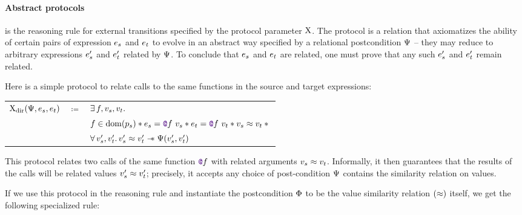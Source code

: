 \paragraph{Abstract protocols}
 is the reasoning rule for external transitions specified by the protocol parameter $\mathrm{X}$.
The protocol is a relation that axiomatizes the ability of certain pairs of expression $\datalangExpr_s$ and $\datalangExpr_t$ to evolve in an abstract way specified by a relational postcondition $\Psi$ -- they may reduce to arbitrary expressions $\datalangExpr_s'$ and $\datalangExpr_t'$ related by $\Psi$.
To conclude that $\datalangExpr_s$ and $\datalangExpr_t$ are related, one must prove that any such $\datalangExpr_s'$ and $\datalangExpr_t'$ remain related.

Here is a simple protocol to relate calls to the same functions in the source and target expressions:

\begin{center}
\begin{tabular}{rcl}
        $\iProt_\mathrm{dir} (\iPredTwo, \datalangExpr_s, \datalangExpr_t)$
        & $\coloneqq$ &
        $\exists \datalangFn, \datalangVal_s, \datalangVal_t \ldotp$
    \\
        &&
        $\datalangFn \in \dom{\datalangProg_s} \iSep
        \datalangExpr_s = \datalangCall{\datalangFnptr{\datalangFn}}{\datalangVal_s} \iSep
        \datalangExpr_t = \datalangCall{\datalangFnptr{\datalangFn}}{\datalangVal_t} \iSep
        \datalangVal_s \iSimilar \datalangVal_t \iSep {}$
    \\
        &&
        $\forall \datalangVal_s', \datalangVal_t' \ldotp
        \datalangVal_s' \iSimilar \datalangVal_t' \iSepImp
        \iPredTwo (\datalangVal_s', \datalangVal_t')$
\end{tabular}
\end{center}

This protocol relates two calls of the same function $\datalangFnptr{\datalangFn}$ with related arguments $\datalangVal_s \iSimilar \datalangVal_t$.
Informally, it then guarantees that the results of the calls will be related values $\datalangVal_s' \iSimilar \datalangVal_t'$; precisely, it accepts any choice of post-condition $\Psi$ contains the similarity relation on values.

If we use this protocol in the reasoning rule  and instantiate the postcondition $\Phi$ to be the value similarity relation $(\approx)$ itself, we get the following specialized rule:

